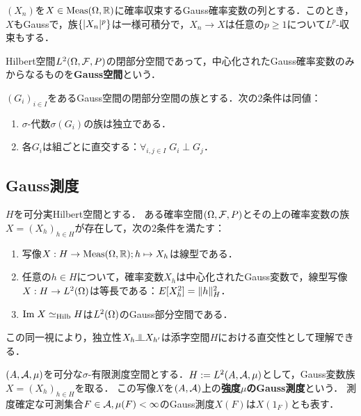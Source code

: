 \documentclass[uplatex,dvipdfmx]{jsreport}
\begin{document}
\begin{proposition}[Gauss確率変数全体の空間は閉部分空間をなす]
    $(X_n)$を$X\in\mathrm{Meas}(\Omega,\mathbb{R})$に確率収束するGauss確率変数の列とする．このとき，$X$もGaussで，族$\{\lvert X_n\rvert^p\}$は一様可積分で，$X_n\to X$は任意の$p\ge1$について$L^p$-収束もする．
\end{proposition}

\begin{definition}
    Hilbert空間$L^2(\Omega,\mathcal{F},P)$の閉部分空間であって，中心化されたGauss確率変数のみからなるものを\textbf{Gauss空間}という．
\end{definition}

\begin{proposition}[独立性の特徴付け]
    $(G_i)_{i\in I}$をあるGauss空間の閉部分空間の族とする．次の2条件は同値：
    \begin{enumerate}
        \item $\sigma$-代数$\sigma(G_i)$の族は独立である．
        \item 各$G_i$は組ごとに直交する：$\forall_{i,j\in I}\;G_i\perp G_j$．
    \end{enumerate}
\end{proposition}

\subsection{Gauss測度}

\begin{proposition}[一般化された独立同分布列の存在定理]
    $H$を可分実Hilbert空間とする．
    ある確率空間$(\Omega,\mathcal{F},P)$とその上の確率変数の族$X=(X_h)_{h\in H}$が存在して，次の2条件を満たす：
    \begin{enumerate}
        \item 写像$X:H\to\mathrm{Meas}(\Omega,\mathbb{R});h\mapsto X_h$は線型である．
        \item 任意の$h\in H$について，確率変数$X_h$は中心化されたGauss変数で，線型写像$X:H\to L^2(\Omega)$は等長である：$E[X_h^2]=\|h\|^2_H$．
        \item $\mathrm{Im}\; X\simeq_{\mathrm{Hilb}} H$は$L^2(\Omega)$のGauss部分空間である．
    \end{enumerate}
\end{proposition}
\begin{remark}
    この同一視により，独立性$X_h\indep X_{h'}$は添字空間$H$における直交性として理解できる．
\end{remark}

\begin{definition}
    $(A,\mathcal{A},\mu)$を可分な$\sigma$-有限測度空間とする．$H:=L^2(A,\mathcal{A},\mu)$として，Gauss変数族$X=(X_h)_{h\in H}$を取る．
    この写像$X$を$(A,\mathcal{A})$上の\textbf{強度$\mu$のGauss測度}という．
    測度確定な可測集合$F\in\mathcal{A},\mu(F)<\infty$のGauss測度$X(F)$は$X(1_F)$とも表す．
\end{definition}
\end{document}
